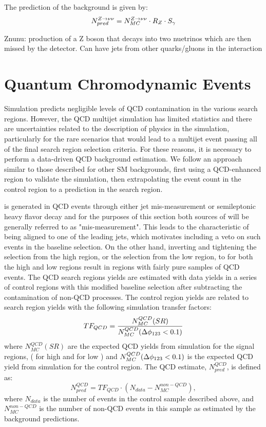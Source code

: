 The prediction of the \Znunu{} background is given by:
\begin{equation}
N_{pred}^{Z\rightarrow\nu\nu}=N_{MC}^{Z\rightarrow\nu\nu} \cdot R_Z \cdot S_\gamma
\end{equation}

Znunu: production of a Z boson that decays into two nuetrinos which are then missed by the detector. Can have jets from other quarks/gluons in the interaction

\section{Quantum Chromodynamic Events}
\label{subsec:QCD}

Simulation predicts negligible levels of QCD contamination in the various search regions. However, the QCD multijet simulation has limited statistics and there are uncertainties related to the description of physics in the simulation, particularly for the rare scenarios that would lead to a multijet event passing all of the final search region selection criteria. For these reasons, it is necessary to perform a data-driven QCD background estimation. We follow an approach similar to those described for other SM backgrounds, first using a QCD-enhanced region to validate the simulation, then extrapolating the event count in the control region to a prediction in the search region. 

\met{} is generated in QCD events through either jet \pt{} mis-measurement or semileptonic heavy flavor decay and for the purposes of this section both sources of \met{} will be generally referred to as "mis-measurement". This leads to the characteristic of \met{} being aligned to one of the leading jets, which motivates including a veto on such events in the baseline selection. On the other hand, inverting and tightening the \qcdhighdm{} selection from the high \dm{} region, or the \qcdlowdm{} selection from the low \dm{} region, to \qcdcr{} for both the high and low \dm{} regions result in regions with fairly pure samples of QCD events. The QCD search regions yields are estimated with data yields in a series of control regions with this modified baseline selection after subtracting the contamination of non-QCD processes. The control region yields are related to search region yields with the following simulation transfer factors:
\begin{equation}\label{QCDTF}
TF_{QCD}=\frac{N_{MC}^{QCD}(SR)}{N_{MC}^{QCD}(\Delta\phi_{123}<0.1)}
\end{equation}
where $N_{MC}^{QCD}(SR)$ are the expected QCD yields from simulation for the signal regions, (\qcdhighdm{} for high \dm{} and \qcdlowdm{} for low \dm) and $N_{MC}^{QCD}(\Delta\phi_{123}<0.1)$ is the expected QCD yield from simulation for the control region. The QCD estimate, $N_{pred}^{QCD}$, is defined as:
\begin{equation}
N_{pred}^{QCD}=TF_{QCD}\cdot(N_{data}-N_{MC}^{non-QCD}),
\end{equation}
where $N_{data}$ is the number of events in the \qcdcr{} control sample described above, and $N_{MC}^{non-QCD}$ is the number of non-QCD events in this sample as estimated by the background predictions.


